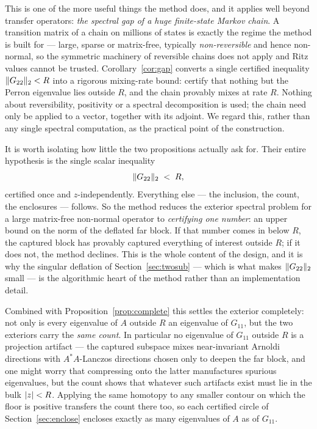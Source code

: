 \documentclass[11pt]{article}
\DeclarePairedDelimiter{\norm}{\lVert}{\rVert}
\DeclarePairedDelimiter{\abs}{\lvert}{\rvert}
\begin{document}
This is one of the more useful things the method does, and it applies well beyond transfer operators:
\emph{the spectral gap of a huge finite-state Markov chain}. A transition matrix of a chain on
millions of states is exactly the regime the method is built for --- large, sparse or matrix-free,
typically \emph{non-reversible} and hence non-normal, so the symmetric machinery of reversible chains
does not apply and Ritz values cannot be trusted. Corollary~\ref{cor:gap} converts a single certified
inequality $\norm{G_{22}}_2<R$ into a rigorous mixing-rate bound: certify that nothing but the Perron
eigenvalue lies outside $R$, and the chain provably mixes at rate $R$. Nothing about reversibility,
positivity or a spectral decomposition is used; the chain need only be applied to a vector, together
with its adjoint. We regard this, rather than any single spectral computation, as the practical point
of the construction.

It is worth isolating how little the two propositions actually ask for. Their entire hypothesis is the
single scalar inequality
\begin{equation}\label{eq:onehypothesis}
  \norm{G_{22}}_2\;<\;R ,
\end{equation}
certified once and $z$-independently. Everything else --- the inclusion, the count, the enclosures ---
follows. So the method reduces the exterior spectral problem for a large matrix-free non-normal
operator to \emph{certifying one number}: an upper bound on the norm of the deflated far block. If that
number comes in below $R$, the captured block has provably captured everything of interest outside $R$;
if it does not, the method declines. This is the whole content of the design, and it is why the
singular deflation of Section~\ref{sec:twosub} --- which is what makes $\norm{G_{22}}_2$ small --- is
the algorithmic heart of the method rather than an implementation detail.

Combined with Proposition~\ref{prop:complete} this settles the exterior completely: not only is every
eigenvalue of $A$ outside $R$ an eigenvalue of $G_{11}$, but the two exteriors carry the \emph{same
count}. In particular no eigenvalue of $G_{11}$ outside $R$ is a projection artifact --- the captured
subspace mixes near-invariant Arnoldi directions with $A^*A$-Lanczos directions chosen only to deepen
the far block, and one might worry that compressing onto the latter manufactures spurious eigenvalues,
but the count shows that whatever such artifacts exist must lie in the bulk $\abs{z}<R$. Applying the
same homotopy to any smaller contour on which the floor is positive transfers the count there too, so
each certified circle of Section~\ref{sec:enclose} encloses exactly as many eigenvalues of $A$ as of
$G_{11}$.
\end{document}
